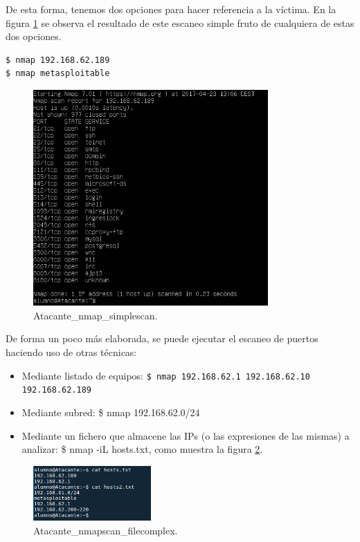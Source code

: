 \documentclass[a4,12pt,onecolum]{article}
\begin{document}
De esta forma, tenemos dos opciones para hacer referencia a la víctima. En la figura \ref{fig:nmap2} se observa el resultado de este escaneo simple fruto de cualquiera de estas dos opciones.

\begin{verbatim}
$ nmap 192.168.62.189
$ nmap metasploitable
\end{verbatim}

\begin{figure}[htbp]
\centering
\includegraphics[width=0.8\textwidth]{./images/Atacante_nmap_simplescan.png}
\caption{Atacante\_nmap\_simplescan.}
\label{fig:nmap2}
\end{figure}

De forma un poco más elaborada, se puede ejecutar el escaneo de puertos haciendo uso de otras técnicas:

\begin{itemize}
  \item Mediante listado de equipos: \texttt{\$ nmap 192.168.62.1 192.168.62.10 192.168.62.189}
  \item Mediante subred: \$ nmap 192.168.62.0/24
  \item Mediante un fichero que almacene las IPs (o las expresiones de las mismas) a analizar: \$ nmap -iL hosts.txt, como muestra la figura \ref{fig:nmap3}.
\end{itemize}

\begin{figure}[htbp]
\centering
\includegraphics[width=0.4\textwidth]{./images/Atacante_nmapscan_filecomplex.png}
\caption{Atacante\_nmapscan\_filecomplex.}
\label{fig:nmap3}
\end{figure}
\end{document}
